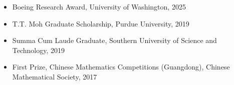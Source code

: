 \begin{itemize}
  \item Boeing Research Award, University of Washington, 2025
  \item T.T. Moh Graduate Scholarship, Purdue University, 2019
  \item Summa Cum Laude Graduate, Southern University of Science and Technology, 2019
  \item First Prize, Chinese Mathematics Competitions (Guangdong), Chinese Mathematical Society, 2017
\end{itemize}
